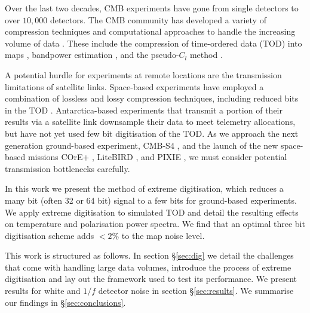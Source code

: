 \documentclass[a4paper,fleqn,usenatbib]{mnras}
\begin{document}

Over the last two decades, CMB experiments have gone from single detectors to over $10,000$ detectors. The CMB community has developed a variety of compression techniques and computational approaches to handle the increasing volume of data \citep{tristam2007}. These include the compression of time-ordered data (TOD) into maps \citep{tegmark1997}, bandpower estimation \citep{tegmark1998}, and the pseudo-$C_l$ method \citep{brown2005}.

A potential hurdle for experiments at remote locations are the transmission limitations of satellite links. Space-based experiments have employed a combination of lossless and lossy compression techniques, including reduced bits in the TOD \citep{gaztanaga1998, maris2003}. Antarctica-based experiments that transmit a portion of their results via a satellite link downsample their data to meet telemetry allocations, but have not yet used few bit digitisation of the TOD. As we approach the next generation ground-based experiment, CMB-S4 \citep{s4sciencebook}, and the launch of the new space-based missions COrE+ \citep{core2018}, LiteBIRD \citep{litebird2016}, and PIXIE \citep{pixie2011}, we must consider potential transmission bottlenecks carefully. %

In this work we present the method of extreme digitisation, which reduces a many bit (often 32 or 64 bit) signal to a few bits for ground-based experiments. We apply extreme digitisation to simulated TOD and detail the resulting effects on temperature and polarisation power spectra. We find that an optimal three bit digitisation scheme adds $<2\%$ to the map noise level.

This work is structured as follows. In section \S\ref{sec:dig} we detail the challenges that come with handling large data volumes, introduce the process of extreme digitisation and lay out the framework used to test its performance. We present results for white and $1/f$ detector noise in section \S\ref{sec:results}. We summarise our findings in \S\ref{sec:conclusions}.

\end{document}
